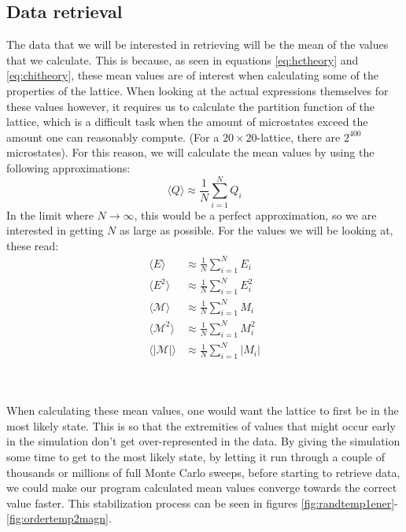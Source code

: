 \documentclass[reprint,english,notitlepage]{revtex4-1}  %
\begin{document}
\subsection{Data retrieval}\label{sec:data}

The data that we will be interested in retrieving will be the mean of the values that we calculate. This is because, as seen in equations \ref{eq:hctheory} and \ref{eq:chitheory}, these mean values are of interest when calculating some of the properties of the lattice. When looking at the actual expressions themselves for these values however, it requires us to calculate the partition function of the lattice, which is a difficult task when the amount of microstates exceed the amount one can reasonably compute. (For a $20\times20$-lattice, there are $2^{400}$ microstates). For this reason, we will calculate the mean values by using the following approximations:
\begin{equation}\label{eq:generalapprox}
    \langle Q \rangle \approx \frac{1}{N}\sum\limits_{i=1}^N Q_i
\end{equation}
In the limit where $N\to\infty$, this would be a perfect approximation, so we are interested in getting $N$ as large as possible. For the values we will be looking at, these read:
\begin{align}
    \langle E \rangle &\approx \frac{1}{N}\sum\limits_{i=1}^N E_i\\
    \langle E^2 \rangle &\approx \frac{1}{N}\sum\limits_{i=1}^N E_i^2\\
    \langle \mathcal{M} \rangle &\approx \frac{1}{N}\sum\limits_{i=1}^N M_i\\
    \langle \mathcal{M}^2 \rangle &\approx \frac{1}{N}\sum\limits_{i=1}^N M_i^2\\
    \langle |\mathcal{M}| \rangle &\approx \frac{1}{N}\sum\limits_{i=1}^N |M_i|    
\end{align}

\\
\\
When calculating these mean values, one would want the lattice to first be in the most likely state. This is so that the extremities of values that might occur early in the simulation don't get over-represented in the data. By giving the simulation some time to get to the most likely state, by letting it run through a couple of thousands or millions of full Monte Carlo sweeps, before starting to retrieve data, we could make our program calculated mean values converge towards the correct value faster. This stabilization process can be seen in figures \ref{fig:randtemp1ener}-\ref{fig:ordertemp2magn}.
\end{document}
